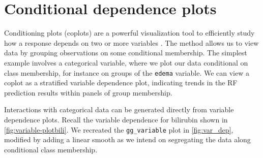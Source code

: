 \documentclass[article]{jss}
\begin{document}
\section{Conditional dependence
plots}\label{conditional-dependence-plots}

Conditioning plots (coplots) \citep{chambers:1992,cleveland:1993} are a
powerful visualization tool to efficiently study how a response depends
on two or more variables \citep{cleveland:1993}. The method allows us to
view data by grouping observations on some conditional membership. The
simplest example involves a categorical variable, where we plot our data
conditional on class membership, for instance on groups of the
\texttt{edema} variable. We can view a coplot as a stratified variable
dependence plot, indicating trends in the RF prediction results within
panels of group membership.

Interactions with categorical data can be generated directly from
variable dependence plots. Recall the variable dependence for bilirubin
shown in \autoref{fig:variable-plotbili}. We recreated the
\texttt{gg\_variable} plot in \autoref{fig:var_dep}, modified by adding
a linear smooth as we intend on segregating the data along conditional
class membership.
\end{document}
